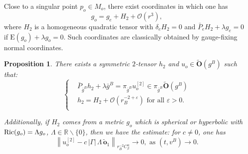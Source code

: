 \documentclass[11pt,reqno]{amsart}
\numberwithin{equation}{section}
\newcommand{\Ric}{{\rm Ric}}
\newcommand{\E}{\mathrm{E}}
\newtheorem{prop}[thm]{Proposition}
\theoremstyle{definition}
\theoremstyle{remark}
\begin{document}
Close to a singular point $p_o\in M_o$, there exist coordinates in which one has 
\begin{equation}\label{eq:dvp go}
    g_o = g_{e} + H_2 + \mathcal{O}(r^{3}),
\end{equation}
where $H_2$ is a homogeneous quadratic tensor with $\delta_{e}H_2=0$ and $\bar{P}_eH_2 + \lambda g_{e}=0$ if $\E(g_o)+\lambda g_o = 0$. Such coordinates are classically obtained by gauge-fixing normal coordinates. 
\begin{prop}\label{prop:extension quadratic}
    There exists a symmetric $2$-tensor $h_2$ and $u_o\in \tilde{\mathbf{O}}(g^B)$ such that:
    \begin{equation}\label{eq: ext quadratic terms}
        \left\{\begin{aligned}
            &\bar{P}_{\bar{g}^B}h_2 +\lambda \bar{g}^B ={\pi_{\bar{g}^B}}u_o^{[2]}\in {\pi_{\bar{g}^B}}\tilde{\mathbf{O}}(g^B)\\
            &h_2 = H_2 + \mathcal{O}(r_B^{-2+\varepsilon}) \text{ for all $\varepsilon>0$.}\\
        \end{aligned}\right.
    \end{equation}

    Additionally, if $H_2$ comes from a metric $g_o$ which is spherical or hyperbolic with $\Ric(g_o)=\Lambda g_o$, $\Lambda\in \mathbb{R}\backslash\{0\}$, then we have the estimate: for $c\neq 0$, one has
    \begin{equation}\label{eq:est obst tree}
        \left\|u_o^{[2]} - c\,|\Gamma|\,\Lambda \,\tilde{\mathbf{o}}_1 \right\|_{r_B^{-2}C^{\alpha}_\beta}\to 0, \text{ as $(t,v^B)\to 0$.}
    \end{equation}
\end{prop}
\end{document}
